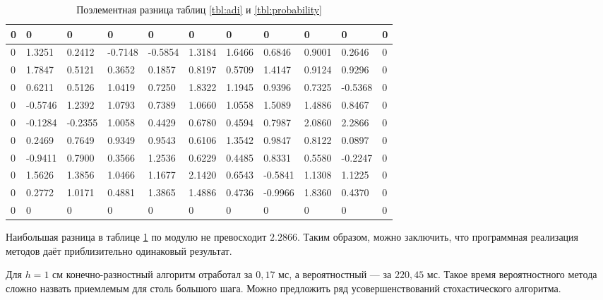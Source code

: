 \documentclass[12pt, a4paper]{article}
\begin{document}
\begin{table}[H]
	\small
	\caption{Поэлементная разница таблиц \ref{tbl:adi} и \ref{tbl:probability}}
	\label{tbl:diff}
	\begin{tabular}{|l|l|l|l|l|l|l|l|l|l|l|}
		\hline
		0 & 0       & 0       & 0       & 0       & 0      & 0      & 0       & 0      & 0       & 0 \\ \hline
		0 & 1.3251  & 0.2412  & -0.7148 & -0.5854 & 1.3184 & 1.6466 & 0.6846  & 0.9001 & 0.2646  & 0 \\ \hline
		0 & 1.7847  & 0.5121  & 0.3652  & 0.1857  & 0.8197 & 0.5709 & 1.4147  & 0.9124 & 0.9296  & 0 \\ \hline
		0 & 0.6211  & 0.5126  & 1.0419  & 0.7250  & 1.8322 & 1.1945 & 0.9396  & 0.7325 & -0.5368 & 0 \\ \hline
		0 & -0.5746 & 1.2392  & 1.0793  & 0.7389  & 1.0660 & 1.0558 & 1.5089  & 1.4886 & 0.8467  & 0 \\ \hline
		0 & -0.1284 & -0.2355 & 1.0058  & 0.4429  & 0.6780 & 0.4594 & 0.7987  & 2.0860 & 2.2866  & 0 \\ \hline
		0 & 0.2469  & 0.7649  & 0.9349  & 0.9543  & 0.6106 & 1.3542 & 0.9847  & 0.8122 & 0.0897  & 0 \\ \hline
		0 & -0.9411 & 0.7900  & 0.3566  & 1.2536  & 0.6229 & 0.4485 & 0.8331  & 0.5580 & -0.2247 & 0 \\ \hline
		0 & 1.5626  & 1.3856  & 1.0466  & 1.1677  & 2.1420 & 0.6543 & -0.5841 & 1.1308 & 1.1225  & 0 \\ \hline
		0 & 0.2772  & 1.0171  & 0.4881  & 1.3865  & 1.4886 & 0.4736 & -0.9966 & 1.8360 & 0.4370  & 0 \\ \hline
		0 & 0       & 0       & 0       & 0       & 0      & 0      & 0       & 0      & 0       & 0 \\ \hline
	\end{tabular}
\end{table}

Наибольшая разница в таблице \ref{tbl:diff} по модулю не превосходит $2.2866$.
Таким образом, можно заключить, что программная реализация методов даёт приблизительно одинаковый результат.

Для $h = 1$ см конечно-разностный алгоритм отработал за $0,17$ мс, а вероятностный — за $220,45$ мс.
Такое время вероятностного метода сложно назвать приемлемым для столь большого шага. Можно предложить ряд усовершенствований стохастического алгоритма.
\end{document}
